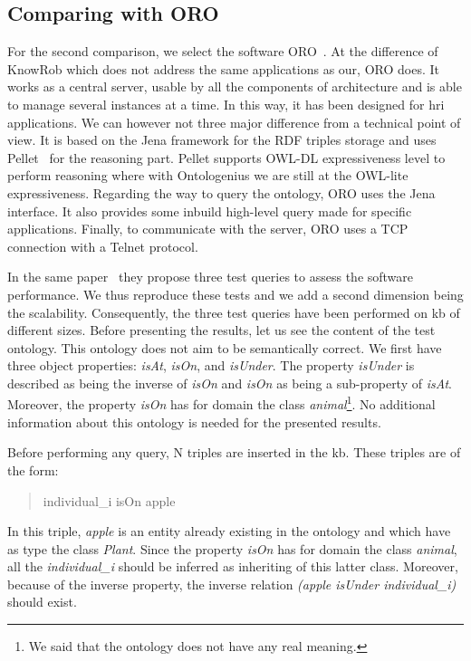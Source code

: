 \subsection{Comparing with ORO}

For the second comparison, we select the software ORO~\cite{lemaignan_2010_oro}. At the difference of KnowRob which does not address the same applications as our, ORO does. It works as a central server, usable by all the components of architecture and is able to manage several instances at a time. In this way, it has been designed for \acrshort{hri} applications. We can however not three major difference from a technical point of view. It is based on the Jena framework for the RDF triples storage and uses Pellet~\cite{sirin_2007_pellet} for the reasoning part. Pellet supports OWL-DL expressiveness level to perform reasoning where with Ontologenius we are still at the OWL-lite expressiveness. Regarding the way to query the ontology, ORO uses the Jena \sparql{} interface. It also provides some inbuild high-level query made for specific applications. Finally, to communicate with the server, ORO uses a TCP connection with a Telnet protocol.

In the same paper~\cite{lemaignan_2010_oro} they propose three test queries to assess the software performance. We thus reproduce these tests and we add a second dimension being the scalability. Consequently, the three test queries have been performed on \acrshort{kb} of different sizes. Before presenting the results, let us see the content of the test ontology. This ontology does not aim to be semantically correct. We first have three object properties: \textit{isAt}, \textit{isOn}, and \textit{isUnder}. The property \textit{isUnder} is described as being the inverse of \textit{isOn} and \textit{isOn} as being a sub-property of \textit{isAt}. Moreover, the property \textit{isOn} has for domain the class \textit{animal}\footnote{We said that the ontology does not have any real meaning.}. No additional information about this ontology is needed for the presented results.

Before performing any query, N triples are inserted in the \acrshort{kb}. These triples are of the form:

\begin{quote} 
\centering 
individual\_i isOn apple
\end{quote}

In this triple, \textit{apple} is an entity already existing in the ontology and which have as type the class \textit{Plant}. Since the property \textit{isOn} has for domain the class \textit{animal}, all the \textit{individual\_i} should be inferred as inheriting of this latter class. Moreover, because of the inverse property, the inverse relation \textit{(apple isUnder individual\_i)} should exist.

